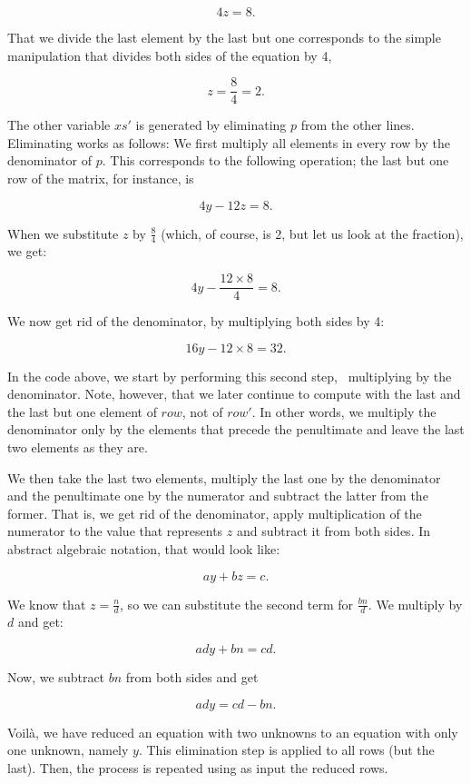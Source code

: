 \documentclass[tikz]{scrreprt}
\newcommand{\Varid}[1]{\mathit{#1}}
\begin{document}
\[
4z = 8.
\]

That we divide the last element by the last but one
corresponds to the simple manipulation that divides
both sides of the equation by 4, \ie\

\[
z = \frac{8}{4} = 2.
\]

The other variable \ensuremath{\Varid{xs'}} is generated by eliminating $p$
from the other lines. Eliminating works as follows:
We first multiply all elements in every row
by the denominator of $p$.
This corresponds to the following operation;
the last but one row of the matrix, for instance, is

\[
4y - 12z = 8.
\]

When we substitute $z$ by $\frac{8}{4}$ (which, of course,
is 2, but let us look at the fraction), we get:

\[
4y - \frac{12\times 8}{4} = 8.
\]

We now get rid of the denominator, by multiplying both sides by 4:

\[
16y - 12\times 8 = 32.
\]

In the code above, we start by performing this second step,
\ie\ multiplying by the denominator.
Note, however, that we later continue to compute with
the last and the last but one element of \ensuremath{\Varid{row}}, not of \ensuremath{\Varid{row'}}.
In other words, we multiply the denominator only by the elements
that precede the penultimate and 
leave the last two elements as they are.

We then take the last two elements,
multiply the last one by the denominator and
the penultimate one by the numerator and
subtract the latter from the former.
That is, we get rid of the denominator, apply
multiplication of the numerator to the value
that represents $z$ and subtract it from both sides.
In abstract algebraic notation, that would look like:

\[
ay + bz = c.
\]

We know that $z=\frac{n}{d}$, so we can substitute
the second term for $\frac{bn}{d}$.
We multiply by $d$ and get:

\[
ady + bn = cd.
\]

Now, we subtract $bn$ from both sides and get

\[
ady = cd - bn.
\]

Voilà, we have reduced an equation with two unknowns
to an equation with only one unknown, namely $y$.
This elimination step is applied to all rows
(but the last). Then, the process is repeated
using as input the reduced rows.
\end{document}
